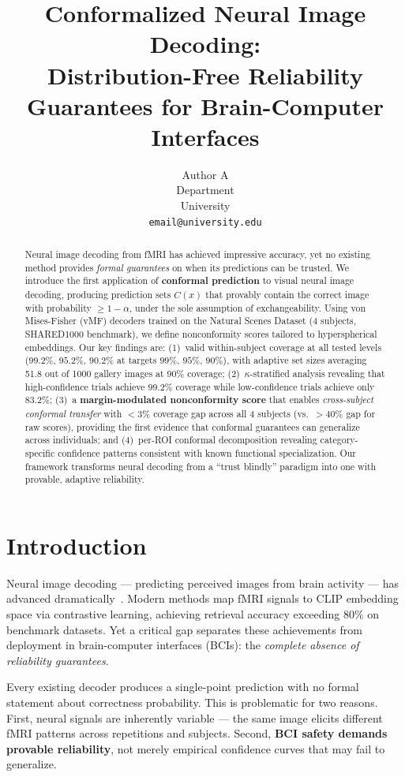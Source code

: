 \documentclass{article}
\title{Conformalized Neural Image Decoding:\\Distribution-Free Reliability Guarantees for Brain-Computer Interfaces}
\author{
  Author A \\
  Department\\
  University\\
  \texttt{email@university.edu}
}
\begin{document}
\maketitle

\begin{abstract}
Neural image decoding from fMRI has achieved impressive accuracy, yet no existing method provides \emph{formal guarantees} on when its predictions can be trusted. We introduce the first application of \textbf{conformal prediction} to visual neural image decoding, producing prediction sets $C(x)$ that provably contain the correct image with probability $\geq 1-\alpha$, under the sole assumption of exchangeability. Using von Mises-Fisher (vMF) decoders trained on the Natural Scenes Dataset (4 subjects, SHARED1000 benchmark), we define nonconformity scores tailored to hyperspherical embeddings. Our key findings are: (1)~valid within-subject coverage at all tested levels ($99.2\%$, $95.2\%$, $90.2\%$ at targets $99\%$, $95\%$, $90\%$), with adaptive set sizes averaging 51.8 out of 1000 gallery images at $90\%$ coverage; (2)~$\kappa$-stratified analysis revealing that high-confidence trials achieve $99.2\%$ coverage while low-confidence trials achieve only $83.2\%$; (3)~a \textbf{margin-modulated nonconformity score} that enables \emph{cross-subject conformal transfer} with $<3\%$ coverage gap across all 4 subjects (vs.\ $>40\%$ gap for raw scores), providing the first evidence that conformal guarantees can generalize across individuals; and (4)~per-ROI conformal decomposition revealing category-specific confidence patterns consistent with known functional specialization. Our framework transforms neural decoding from a ``trust blindly'' paradigm into one with provable, adaptive reliability.
\end{abstract}

\section{Introduction}

Neural image decoding --- predicting perceived images from brain activity --- has advanced dramatically~\citep{scotti2024mindeye2, ozcelik2023brain}. Modern methods map fMRI signals to CLIP embedding space via contrastive learning, achieving retrieval accuracy exceeding $80\%$ on benchmark datasets. Yet a critical gap separates these achievements from deployment in brain-computer interfaces (BCIs): the \emph{complete absence of reliability guarantees}.

Every existing decoder produces a single-point prediction with no formal statement about correctness probability. This is problematic for two reasons. First, neural signals are inherently variable --- the same image elicits different fMRI patterns across repetitions and subjects. Second, \textbf{BCI safety demands provable reliability}, not merely empirical confidence curves that may fail to generalize.
\end{document}
